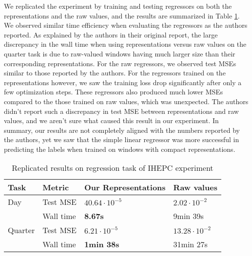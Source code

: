 We replicated the experiment by training and testing regressors on both the representations and the raw values, and the results are summarized in Table \ref{tab:ihepc}. We observed similar time efficiency when evaluating the regressors as the authors reported. As explained by the authors in their original report, the large discrepancy in the wall time when using representations versus raw values on the quarter task is due to raw-valued windows having much larger size than their corresponding representations. For the raw regressors, we observed test MSEs similar to those reported by the authors. For the regressors trained on the representations however, we saw the training loss drop significantly after only a few optimization steps. These regressors also produced much lower MSEs compared to the those trained on raw values, which was unexpected. The authors didn't report such a discrepancy in test MSE between representations and raw values, and we aren't sure what caused this result in our experiment. In summary, our results are not completely aligned with the numbers reported by the authors, yet we saw that the simple linear regressor was more successful in predicting the labels when trained on windows with compact representations.




\begin{table}[h!]
\caption{Replicated results on regression task of IHEPC experiment}
\label{tab:ihepc}
\centering
\begin{tabular}{llll}
\hline
Task    & Metric    & Our Representations       & Raw values \\ \hline
Day     & Test MSE  &     $40.64 \cdot 10 ^{-5}$ & $2.02 \cdot 10^{-2}$ \\ 
        & Wall time &        \textbf{8.67s}            &  9min 39s  \\ \hline
Quarter & Test MSE  &   $6.21 \cdot 10^{-5}$ & $13.28 \cdot 10^{-2}$ \\ 
        & Wall time &       \textbf{1min 38s}      & 31min 27s      \\ \hline
\end{tabular}
\end{table}

